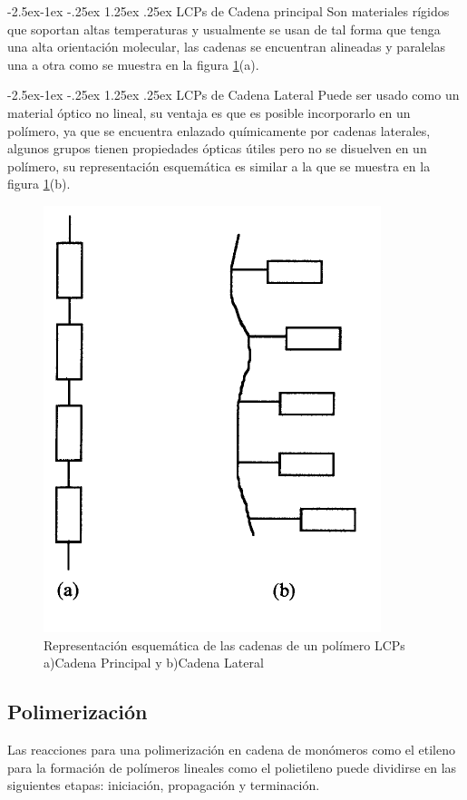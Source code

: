 \documentclass[a4paper, 11pt]{article}
\makeatletter
\renewcommand\paragraph{\@startsection{paragraph}{4}{\z@}%
            {-2.5ex\@plus -1ex \@minus -.25ex}%
            {1.25ex \@plus .25ex}%
            {\normalfont\normalsize\bfseries}}
\makeatother
\begin{document}
\noindent
\paragraph{LCPs de Cadena principal} 
Son materiales rígidos que soportan altas temperaturas y usualmente se usan de tal forma que tenga una alta orientación molecular, las cadenas se encuentran alineadas y paralelas una a otra como se muestra en la figura \ref{cadenas_lcp}(a).

\paragraph{LCPs de Cadena Lateral} Puede ser usado como un material óptico no lineal, su ventaja es que es posible incorporarlo en un polímero, ya que  se encuentra enlazado químicamente por cadenas laterales, algunos grupos tienen propiedades ópticas útiles pero no se disuelven en un polímero, su representación esquemática es similar a la que se muestra en la figura \ref{cadenas_lcp}(b).\\
\begin{figure}[h!] 
\centering
\captionsetup{justification=centering}
    \includegraphics[scale=0.75]{cadenas_lcp.png} 
     \caption{Representación esquemática de las cadenas de un polímero LCPs a)Cadena Principal y b)Cadena Lateral}
    \label{cadenas_lcp}
\end{figure}
\subsection{Polimerización}
 Las reacciones para una polimerización en cadena de monómeros como el etileno para la formación de polímeros lineales como el polietileno puede dividirse en las siguientes etapas: iniciación, propagación y terminación.
\end{document}
